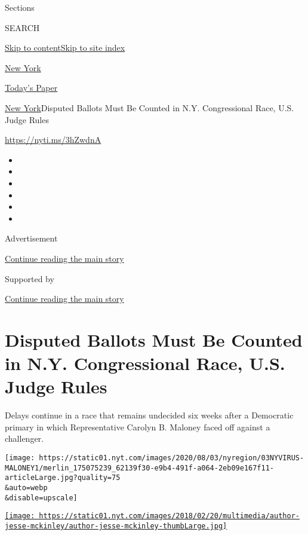 Sections

SEARCH

\protect\hyperlink{site-content}{Skip to
content}\protect\hyperlink{site-index}{Skip to site index}

\href{https://www.nytimes.com/section/nyregion}{New York}

\href{https://myaccount.nytimes.com/auth/login?response_type=cookie\&client_id=vi}{}

\href{https://www.nytimes.com/section/todayspaper}{Today's Paper}

\href{/section/nyregion}{New York}\textbar{}Disputed Ballots Must Be
Counted in N.Y. Congressional Race, U.S. Judge Rules

\href{https://nyti.ms/3hZwdnA}{https://nyti.ms/3hZwdnA}

\begin{itemize}
\item
\item
\item
\item
\item
\item
\end{itemize}

Advertisement

\protect\hyperlink{after-top}{Continue reading the main story}

Supported by

\protect\hyperlink{after-sponsor}{Continue reading the main story}

\hypertarget{disputed-ballots-must-be-counted-in-ny-congressional-race-us-judge-rules}{%
\section{Disputed Ballots Must Be Counted in N.Y. Congressional Race,
U.S. Judge
Rules}\label{disputed-ballots-must-be-counted-in-ny-congressional-race-us-judge-rules}}

Delays continue in a race that remains undecided six weeks after a
Democratic primary in which Representative Carolyn B. Maloney faced off
against a challenger.

\texttt{[image: https://static01.nyt.com/images/2020/08/03/nyregion/03NYVIRUS-MALONEY1/merlin\_175075239\_62139f30-e9b4-491f-a064-2eb09e167f11-articleLarge.jpg?quality=75\\\&auto=webp\\\&disable=upscale]}

\href{https://www.nytimes.com/by/jesse-mckinley}{\texttt{[image: https://static01.nyt.com/images/2018/02/20/multimedia/author-jesse-mckinley/author-jesse-mckinley-thumbLarge.jpg]}}

